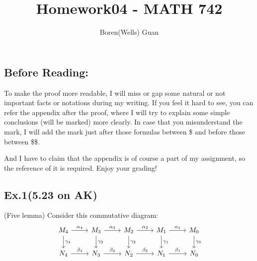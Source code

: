 \documentclass[lang=en,11pt,a4paper,citestyle =authoryear]{elegantpaper}
\title{Homework04 - MATH 742}
\author{Boren(Wells) Guan}
\begin{document}
\maketitle

\subsection*{Before Reading:}\par
To make the proof more readable, I will miss or gap some natural or not important facts or notations during my writing. If you feel it hard to see, you can refer the appendix after the proof, where I will try to explain some simple conclusions (will be marked) more clearly. In case that you misunderstand the mark, I will add the mark just after those formulas between \$ and before those between \$\$.\par
And I have to claim that the appendix is of course a part of my assignment, so the reference of it is required. Enjoy your grading!

\subsection*{Ex.1(5.23 on AK)} 
(Five lemma) Consider this commutative diagram:
\[
\begin{tikzcd}
    M_4\arrow[r,"\alpha_4"]\arrow[d,"\gamma_4"] & M_3\arrow[r,"\alpha_3"]\arrow[d,"\gamma_3"] & M_2\arrow[r,"\alpha_2"]\arrow[d,"\gamma_2"] & M_1\arrow[r,"\alpha_1"]\arrow[d,"\gamma_1"] & M_0\arrow[d,"\gamma_0"] \\
    N_4\arrow[r,"\beta_4"] & N_3\arrow[r,"\beta_3"] & N_2\arrow[r,"\beta_2"] & N_1\arrow[r,"\beta_1"] & N_0 \\
\end{tikzcd}
\]
\end{document}
